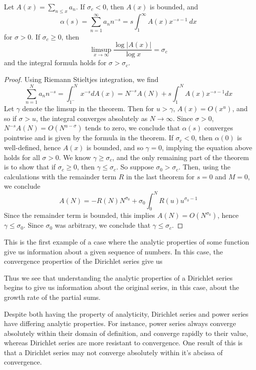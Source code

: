 \begin{theorem}
    Let $A(x) = \sum_{n \leq x} a_n$. If $\sigma_c < 0$, then $A(x)$ is bounded, and
    \[ \alpha(s) = \sum_{n = 1}^\infty a_n n^{-s} = s \int_1^\infty A(x) x^{-s-1}\ dx \]
    for $\sigma > 0$. If $\sigma_c \geq 0$, then
    \[ \limsup_{x \to \infty} \frac{\log |A(x)|}{\log x} = \sigma_c \]
    and the integral formula holds for $\sigma > \sigma_c$.
\end{theorem}
\begin{proof}
    Using Riemann Stieltjes integration, we find
    \[ \sum_{n = 1}^N a_n n^{-s} = \int_{1^-}^N x^{-s} dA(x) = N^{-s} A(N) + s \int_1^N A(x) x^{-s-1} dx \]
    Let $\gamma$ denote the limsup in the theorem. Then for $u > \gamma$, $A(x) = O(x^u)$, and so if $\sigma > u$, the integral converges absolutely as $N \to \infty$. Since $\sigma > 0$, $N^{-s} A(N) = O(N^{u-\sigma})$ tends to zero, we conclude that $\alpha(s)$ converges pointwise and is given by the formula in the theorem. If $\sigma_c < 0$, then $\alpha(0)$ is well-defined, hence $A(x)$ is bounded, and so $\gamma = 0$, implying the equation above holds for all $\sigma > 0$. We know $\gamma \geq \sigma_c$, and the only remaining part of the theorem is to show that if $\sigma_c \geq 0$, then $\gamma \leq \sigma_c$. So suppose $\sigma_0 > \sigma_c$. Then, using the calculations with the remainder term $R$ in the last theorem for $s = 0$ and $M = 0$, we conclude
    \[ A(N) = -R(N)N^{\sigma_0} + \sigma_0 \int_0^N R(u) u^{\sigma_0 - 1} \]
    Since the remainder term is bounded, this implies $A(N) = O(N^{\sigma_0})$, hence $\gamma \leq \sigma_0$. Since $\sigma_0$ was arbitrary, we conclude that $\gamma \leq \sigma_c$.
\end{proof}

\begin{remark}
    This is the first example of a case where the analytic properties of some function give us information about a given sequence of numbers. In this case, the convergence properties of the Dirichlet series give us

    Thus we see that understanding the analytic properties of a Dirichlet series begins to give us information about the original series, in this case, about the growth rate of the partial sums.
\end{remark}

Despite both having the property of analyticity, Dirichlet series and power series have differing analytic properties. For instance, power series always converge absolutely within their domain of definition, and converge rapidly to their value, whereas Dirichlet series are more resistant to convergence. One result of this is that a Dirichlet series may not converge absolutely within it's abcissa of convergence.

